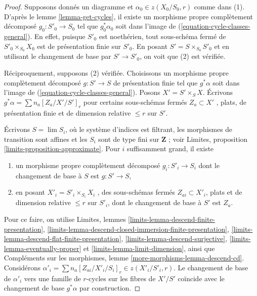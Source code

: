 \begin{proof} 
Supposons donnés un diagramme et $\alpha_0 \in z(X_0/S_0, r)$ comme dans (1). D'après
 le lemme \ref{lemma-get-cycles}, il existe un morphisme propre complètement 
décomposé  $g_0 : S'_0 \to S_0$  tel que $g_0^*\alpha_0$  soit 
dans l'image de (\ref{equation-cycle-classes-general}). En effet, puisque  
$S'_0$ est noethérien, tout sous-schéma fermé de  $S'_0 \times_{S_0} X_0$
  est de présentation finie sur  $S'_0$. En posant  $S' = S \times_{S_0} S'_0$
  et en utilisant le changement de base par $S' \to S'_0$, on voit que (2) est vérifiée. 

\medskip\noindent
 Réciproquement, supposons (2) vérifiée. Choisissons un morphisme propre complètement 
décomposé  $g : S' \to S$  de présentation finie tel que  $g^*\alpha$ soit dans 
l'image de (\ref{equation-cycle-classes-general}). Posons $X' = S' \times_S X$. 
Écrivons $g^*\alpha = \sum n_a [Z_a/X'/S']_r$  pour certains sous-schémas fermés  $Z_a \subset X'$
 , plats, de présentation finie et de dimension relative  
$\leq r$  sur  $S'$. 

\medskip\noindent
 Écrivons $S = \lim S_i$, où le système d'indices est filtrant, les morphismes de transition
 sont affines et les $S_i$ sont de type fini sur $\mathbf{Z}$ 
; voir Limites, proposition \ref{limits-proposition-approximate}.
 Pour $i$ suffisamment grand, il existe 
\begin{enumerate} 
\item un morphisme propre complètement décomposé  $g_i : S'_i \to S_i$
  dont le changement de base à  $S$  est  $g : S' \to S$, 
\item en posant $X'_i = S'_i \times_{S_i} X_i$
 , des sous-schémas fermés $Z_{ai} \subset X'_i$, plats et de
 dimension relative $\leq r$ sur $S'_i$, dont le changement de base à $S'$
 est $Z_a$. 
\end{enumerate} 
Pour ce faire, on utilise Limites, lemmes 
\ref{limits-lemma-descend-finite-presentation}, 
\ref{limits-lemma-descend-closed-immersion-finite-presentation}, 
\ref{limits-lemma-descend-flat-finite-presentation}, 
\ref{limits-lemma-descend-surjective}, 
\ref{limits-lemma-eventually-proper} et 
\ref{limits-lemma-limit-dimension}, ainsi 
que 
Compléments sur les morphismes, lemme 
\ref{more-morphisms-lemma-descend-cd}. 
Considérons $\alpha'_i = \sum n_a [Z_{ai}/X'_i/S_i]_r \in z(X'_i/S'_i, r)$.
 Le changement de base de  $\alpha'_i$  vers une famille de  $r$-cycles sur les fibres
 de $X'/S'$ coïncide avec le changement de base $g^*\alpha$ par construction. 


\end{proof}
